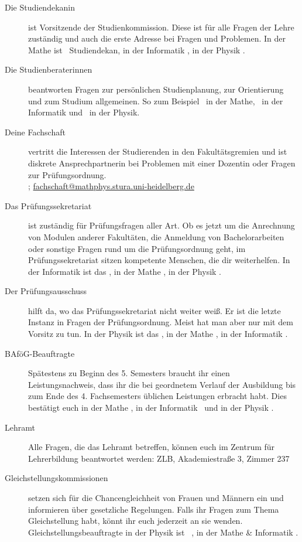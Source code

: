 \begin{description}
\item[Die Studiendekanin] ist Vorsitzende der Studienkommission. Diese ist für alle Fragen der Lehre zuständig und auch die erste Adresse bei Fragen und Problemen. In der Mathe ist \studiendekanmathe\ Studiendekan, in der Informatik \studiendekaninformatik , in der Physik \studiendekanphysik .

\item[Die Studienberaterinnen] beantworten Fragen zur persönlichen Studienplanung, zur Orientierung und zum Studium allgemeinen. So zum Beispiel \studienberatungmathe\ in der Mathe, \studienberatunginformatik\ in der Informatik und \studienberatungphysik\ in der Physik.

\item[Deine Fachschaft] vertritt die Interessen der Studierenden in den Fakultätsgremien und ist diskrete Ansprechpartnerin bei Problemen mit einer Dozentin oder Fragen zur Prüfungsordnung. \\\fsraum; \url{fachschaft@mathphys.stura.uni-heidelberg.de}

\item[Das Prüfungssekretariat] ist zuständig für Prüfungsfragen aller Art. Ob es jetzt um die Anrechnung von Modulen anderer Fakultäten, die Anmeldung von Bachelorarbeiten oder sonstige Fragen rund um die Prüfungsordnung geht, im Prüfungssekretariat sitzen kompetente Menschen, die dir weiterhelfen. In der Informatik ist das \pruefsekinfo, in der Mathe \pruefsekmathe, in der Physik \pruefsekphysik.

\item[Der Prüfungsausschuss] hilft da, wo das Prüfungssekretariat nicht weiter weiß. Er ist die letzte Instanz in Fragen der Prüfungsordnung. Meist hat man aber nur mit dem Vorsitz zu tun. In der Physik ist das \pruefausschussvorsitzphysik, in der Mathe \pruefausschussvorsitzmathe, in der Informatik \pruefausschussvorsitzinformatik.

\item[BAföG-Beauftragte] Spätestens zu Beginn des 5. Semesters braucht ihr einen Leistungsnachweis, dass ihr die bei geordnetem Verlauf der Ausbildung bis zum Ende des 4. Fachsemesters üblichen Leistungen erbracht habt. Dies bestätigt euch in der Mathe \bafogmathe , in der Informatik \bafoginformatik\ und in der Physik \bafogphysik .

\item[Lehramt] Alle Fragen, die das Lehramt betreffen, können euch im Zentrum für Lehrerbildung beantwortet werden: ZLB, Akademiestraße 3, Zimmer 237

\item[Gleichstellungskommissionen] setzen sich für die Chancengleichheit von Frauen und Männern ein und informieren über gesetzliche Regelungen. Falls ihr Fragen zum Thema Gleichstellung habt, könnt ihr euch jederzeit an sie wenden. Gleichstellungsbeauftragte in der Physik ist \gleichstellungsbeauftragtephysik\ , in der Mathe \& Informatik \gleichstellungsbeauftragtemathe.

\end{description}


